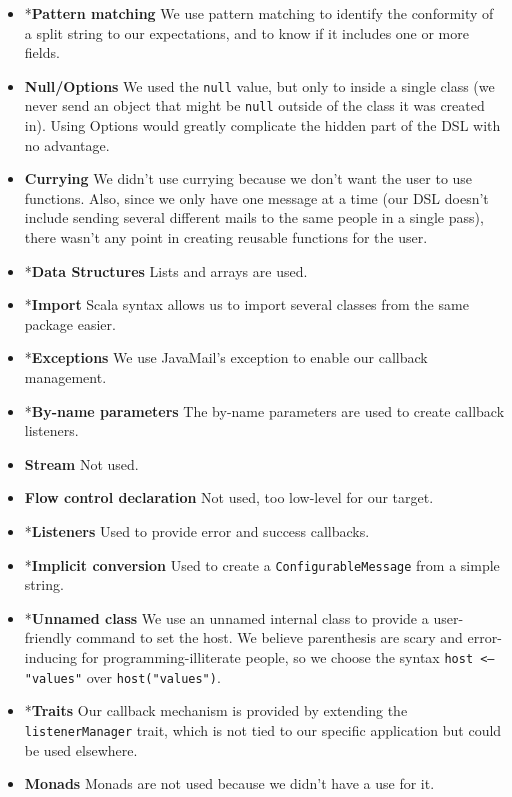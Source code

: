 \documentclass[10pt,a4paper]{article}
\begin{document}
\begin{itemize}
		\item *\textbf{Pattern matching} We use pattern matching to identify the conformity of a split string to our expectations, and to know if it includes one or more fields.
		
		\item \textbf{Null/Options} We used the \texttt{null} value, but only to inside a single class (we never send an object that might be \texttt{null} outside of the class it was created in). Using Options would greatly complicate the hidden part of the DSL with no advantage.
		
		\item \textbf{Currying} We didn't use currying because we don't want the user to use functions. Also, since we only have one message at a time (our DSL doesn't include sending several different mails to the same people in a single pass), there wasn't any point in creating reusable functions for the user.
		
		\item *\textbf{Data Structures} Lists and arrays are used.
		
		\item *\textbf{Import} Scala syntax allows us to import several classes from the same package easier.
		
		\item *\textbf{Exceptions} We use JavaMail's exception to enable our callback management.
		
		\item *\textbf{By-name parameters} The by-name parameters are used to create callback listeners.
		
		\item \textbf{Stream} Not used.
		
		\item \textbf{Flow control declaration} Not used, too low-level for our target.
		
		\item *\textbf{Listeners} Used to provide error and success callbacks.
		
		\item *\textbf{Implicit conversion} Used to create a \texttt{ConfigurableMessage} from a simple string.
		
		\item *\textbf{Unnamed class} We use an unnamed internal class to provide a user-friendly command to set the host. We believe parenthesis are scary and error-inducing for programming-illiterate people, so we choose the syntax \texttt{host <-- "values"} over \texttt{host("values")}.
		
		\item *\textbf{Traits} Our callback mechanism is provided by extending the \texttt{listenerManager} trait, which is not tied to our specific application but could be used elsewhere.
		
		\item \textbf{Monads} Monads are not used because we didn't have a use for it.
	\end{itemize}
\end{document}

